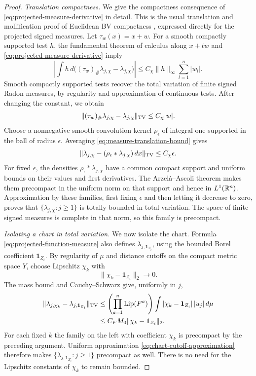 \begin{proof}
\emph{Translation compactness.}
We give the compactness consequence of
\eqref{eq:projected-measure-derivative} in detail. This is the usual
translation and mollification proof of Euclidean BV compactness
\cite[Chapter~2, Theorem~2.6]{Simon2014}, expressed directly for the
projected signed measures.  Let
$\tau_w(x)=x+w$.  For a smooth compactly supported test $h$, the
fundamental theorem of calculus along $x+tw$ and
\eqref{eq:projected-measure-derivative} imply
\[
 \left|\int h\,d\bigl((\tau_w)_\#\lambda_{j,\chi}
                              -\lambda_{j,\chi}\bigr)\right|
 \le C_\chi\|h\|_\infty\sum_{l=1}^n|w_l|.
\]
Smooth compactly supported tests recover the total variation of
finite signed Radon measures, by regularity and approximation of
continuous tests.  After changing the constant, we obtain
\begin{equation}
 \| (\tau_w)_\#\lambda_{j,\chi}-\lambda_{j,\chi}\|_{\mathrm{TV}}
 \le C_\chi|w|.
 \label{eq:measure-translation-bound}
\end{equation}
Choose a nonnegative smooth convolution kernel $\rho_\epsilon$ of
integral one supported in the ball of radius $\epsilon$.  Averaging
\eqref{eq:measure-translation-bound} gives
\[
 \|\lambda_{j,\chi}-(\rho_\epsilon*\lambda_{j,\chi})\,dx\|_{\mathrm{TV}}
 \le C_\chi\epsilon.
\]
For fixed $\epsilon$, the densities
$\rho_\epsilon*\lambda_{j,\chi}$ have a common compact support and
uniform bounds on their values and first derivatives.  The
Arzel\`a--Ascoli theorem makes them precompact in the uniform norm
on that support and hence in $L^1(\mathbb R^n)$.  Approximation by these
families, first fixing $\epsilon$ and then letting it decrease to
zero, proves that $\{\lambda_{j,\chi}:j\ge1\}$ is totally bounded
in total variation.  The space of finite signed measures is complete
in that norm, so this family is precompact.

\emph{Isolating a chart in total variation.}
We now isolate the chart.  Formula
\eqref{eq:projected-function-measure} also defines
$\lambda_{j,\mathbf1_{Z_i}}$, using the bounded Borel coefficient
$\mathbf1_{Z_i}$.  By regularity of $\mu$ and distance cutoffs on the
compact metric space $Y$, choose Lipschitz $\chi_k$ with
\[
 \|\chi_k-\mathbf1_{Z_i}\|_2\longrightarrow0.
\]
The mass bound and Cauchy--Schwarz give, uniformly in $j$,
\begin{align}
 \|\lambda_{j,\chi_k}-\lambda_{j,\mathbf1_{Z_i}}\|_{\mathrm{TV}}
 &\le \left(\prod_{a=1}^n\operatorname{Lip}(F^a)\right)
       \int|\chi_k-\mathbf1_{Z_i}|\,|u_j|\,d\mu \notag\\
 &\le C_FM_0\|\chi_k-\mathbf1_{Z_i}\|_2.
 \label{eq:chart-cutoff-approximation}
\end{align}
For each fixed $k$ the family on the left with coefficient $\chi_k$
is precompact by the preceding argument.  Uniform approximation
\eqref{eq:chart-cutoff-approximation} therefore makes
$\{\lambda_{j,\mathbf1_{Z_i}}:j\ge1\}$ precompact as well.  There is
no need for the Lipschitz constants of $\chi_k$ to remain bounded.


\end{proof}

